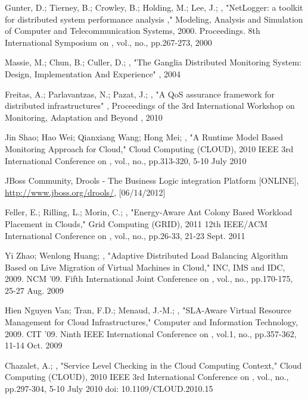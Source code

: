 \documentclass[a4paper]{llncs}
\begin{document}
\begin{thebibliography}{[MT1]}
Gunter, D.; Tierney, B.; Crowley, B.; Holding, M.; Lee, J.; ,
"NetLogger: a toolkit for distributed system performance analysis ," Modeling, Analysis and Simulation of Computer and Telecommunication Systems, 2000. Proceedings. 8th International Symposium on , vol., no., pp.267-273, 2000

Massie, M.; Chun, B.; Culler, D.; ,
"The Ganglia Distributed Monitoring System: Design, Implementation And Experience" , 2004

Freitas, A.; Parlavantzas, N.; Pazat, J.; ,
"A QoS assurance framework for distributed infrastructures" , Proceedings of the 3rd International Workshop on Monitoring, Adaptation and Beyond , 2010 

Jin Shao; Hao Wei; Qianxiang Wang; Hong Mei; , "A Runtime Model Based Monitoring Approach for Cloud," Cloud Computing (CLOUD), 2010 IEEE 3rd International Conference on , vol., no., pp.313-320, 5-10 July 2010

JBoss Community,
Drools - The Business Logic integration Platform [ONLINE],
\url{http://www.jboss.org/drools/}, [06/14/2012]

Feller, E.; Rilling, L.; Morin, C.; , "Energy-Aware Ant Colony Based Workload Placement in Clouds," Grid Computing (GRID), 2011 12th IEEE/ACM International Conference on , vol., no., pp.26-33, 21-23 Sept. 2011

Yi Zhao; Wenlong Huang; ,
"Adaptive Distributed Load Balancing Algorithm Based on Live Migration of Virtual Machines in Cloud," INC, IMS and IDC, 2009. NCM '09. Fifth International Joint Conference on , vol., no., pp.170-175, 25-27 Aug. 2009

Hien Nguyen Van; Tran, F.D.; Menaud, J.-M.; ,
"SLA-Aware Virtual Resource Management for Cloud Infrastructures," Computer and Information Technology, 2009. CIT '09. Ninth IEEE International Conference on , vol.1, no., pp.357-362, 11-14 Oct. 2009

Chazalet, A.; , "Service Level Checking in the Cloud Computing Context,"
Cloud Computing (CLOUD), 2010 IEEE 3rd International Conference on , vol., no., pp.297-304, 5-10 July 2010
doi: 10.1109/CLOUD.2010.15


\end{thebibliography}
%
\end{document}
